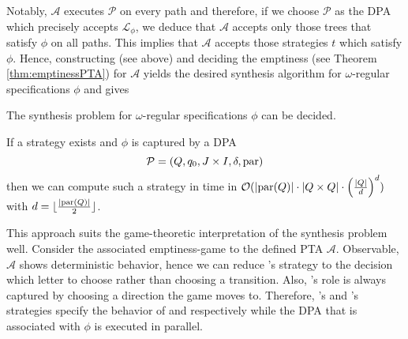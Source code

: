 Notably, $\mathcal{A}$ executes $\mathcal{P}$ on every path and therefore, if 
we choose $\mathcal{P}$ as the \ac{DPA} which precisely accepts 
$\mathcal{L}_{\phi}$, we deduce that $\mathcal{A}$ accepts only those trees 
that satisfy $\phi$ on all paths. This implies that $\mathcal{A}$ accepts those
strategies $t$ which satisfy $\phi$. Hence, constructing (see above) and 
deciding the emptiness (see Theorem \ref{thm:emptinessPTA}) for $\mathcal{A}$ 
yields the desired synthesis algorithm for $\omega$-regular specifications 
$\phi$ and gives
\begin{theorem}
  \cite[Theorem 21, Theorem 22]{AutoInfObj}
  The synthesis problem for $\omega$-regular specifications $\phi$ can be 
  decided.

  If a strategy exists and $\phi$ is captured by a \ac{DPA} 
  \begin{equation*}
    \mathcal{P} = \left(Q, q_{0}, J\times I, \delta, \operatorname{par}\right)
  \end{equation*}
  then we can compute such a strategy in time in 
  $\mathcal{O}(\left\vert{\operatorname{par}(Q)}\right\vert\cdot\left\vert{Q\times Q}\right\vert\cdot\left(
    \frac{\left\vert{Q}\right\vert}{d}\right)^{d})$ with 
  $d = \lfloor \frac{\left\vert{\operatorname{par}(Q)}\right\vert}{2} \rfloor$.
\end{theorem}
This approach suits the game-theoretic interpretation of the synthesis problem
well. Consider the associated emptiness-game to the defined \ac{PTA} 
$\mathcal{A}$. Observable, $\mathcal{A}$ shows deterministic behavior, hence 
we can reduce \eve{}'s strategy to the decision which letter to choose rather
than choosing a transition. Also, \adam{}'s role is always captured by choosing
a direction the game moves to. Therefore, \eve{}'s and \adam{}'s strategies 
specify the behavior of \outputp{} and  respectively while the 
\ac{DPA} that is associated with $\phi$ is executed in parallel.

